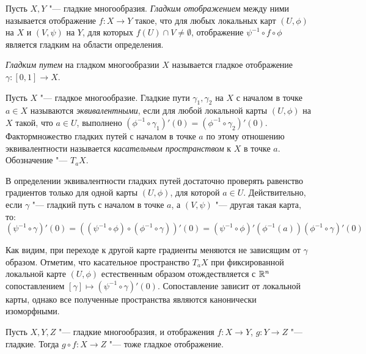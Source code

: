 \begin{definition}
	Пусть $X, Y$ "--- гладкие многообразия. \textit{Гладким отображением} между ними называется отображение $f: X \to Y$ такое, что для любых локальных карт $(U, \phi)$ на $X$ и $(V, \psi)$ на $Y$, для которых $f(U) \cap V \ne \emptyset$, отображение $\psi^{-1} \circ f \circ \phi$ является гладким на области определения.
\end{definition}

\begin{definition}
	\textit{Гладким путем} на гладком многообразии $X$ называется гладкое отображение $\gamma : [0, 1] \to X$.
\end{definition}

\begin{definition}
	Пусть $X$ "--- гладкое многообразие. Гладкие пути $\gamma_1, \gamma_2$ на $X$ с началом в точке $a \in X$ называются \textit{эквивалентными}, если для любой локальной карты $(U, \phi)$ на $X$ такой, что $a \in U$, выполнено $(\phi^{-1} \circ \gamma_1)'(0) = (\phi^{-1} \circ \gamma_2)'(0)$. Фактормножество гладких путей с началом в точке $a$ по этому отношению эквивалентности называется \textit{касательным пространством} к $X$ в точке $a$. Обозначение "--- $T_aX$.
\end{definition}

\begin{note}
	В определении эквивалентности гладких путей достаточно проверять равенство градиентов только для одной карты $(U, \phi)$, для которой $a \in U$. Действительно, если $\gamma$ "--- гладкий путь с началом в точке $a$, а $(V, \psi)$ "--- другая такая карта, то:
	\[(\psi^{-1} \circ \gamma)'(0) = \left((\psi^{-1} \circ \phi) \circ (\phi^{-1} \circ \gamma)\right)'(0) = (\psi^{-1} \circ \phi)'(\phi^{-1}(a))(\phi^{-1} \circ \gamma)'(0)\]
	
	Как видим, при переходе к другой карте градиенты меняются не зависящим от $\gamma$ образом. Отметим, что касательное пространство $T_aX$ при фиксированной локальной карте $(U, \phi)$ естественным образом отождествляется с $\mathbb{R}^n$ сопоставлением $[\gamma] \mapsto (\psi^{-1} \circ \gamma)'(0)$. Сопоставление зависит от локальной карты, однако все полученные пространства являются канонически изоморфными.
\end{note}

\begin{proposition}
	Пусть $X, Y, Z$ "--- гладкие многообразия, и отображения $f : X \to Y$, $g : Y \to Z$ "--- гладкие. Тогда $g \circ f : X \to Z$ "--- тоже гладкое отображение.
\end{proposition}

